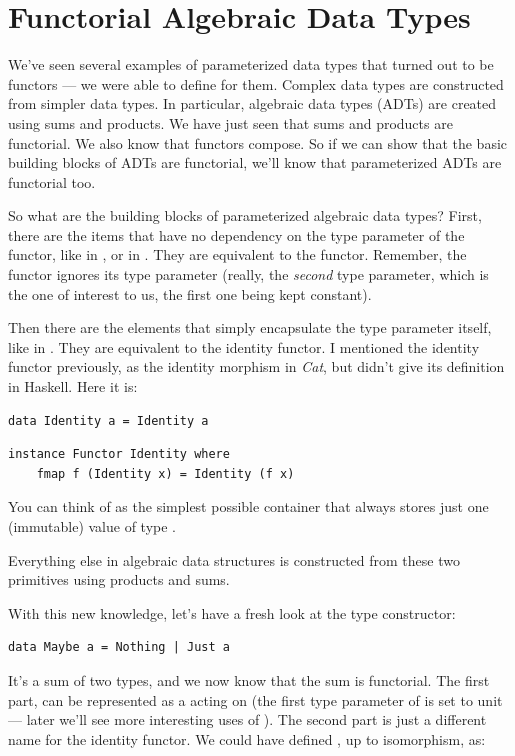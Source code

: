 \section{Functorial Algebraic Data
Types}\label{functorial-algebraic-data-types}

We've seen several examples of parameterized data types that turned out
to be functors --- we were able to define  for them.
Complex data types are constructed from simpler data types. In
particular, algebraic data types (ADTs) are created using sums and
products. We have just seen that sums and products are functorial. We
also know that functors compose. So if we can show that the basic
building blocks of ADTs are functorial, we'll know that parameterized
ADTs are functorial too.

So what are the building blocks of parameterized algebraic data types?
First, there are the items that have no dependency on the type parameter
of the functor, like  in , or 
in . They are equivalent to the  functor.
Remember, the  functor ignores its type parameter (really,
the \emph{second} type parameter, which is the one of interest to us,
the first one being kept constant).

Then there are the elements that simply encapsulate the type parameter
itself, like  in . They are equivalent to the
identity functor. I mentioned the identity functor previously, as the
identity morphism in \emph{Cat}, but didn't give its definition in
Haskell. Here it is:

\begin{Verbatim}[commandchars=\\\{\}]
data Identity a = Identity a
\end{Verbatim}

\begin{Verbatim}[commandchars=\\\{\}]
instance Functor Identity where
    fmap f (Identity x) = Identity (f x)
\end{Verbatim}
You can think of  as the simplest possible container
that always stores just one (immutable) value of type .

Everything else in algebraic data structures is constructed from these
two primitives using products and sums.

With this new knowledge, let's have a fresh look at the 
type constructor:

\begin{Verbatim}[commandchars=\\\{\}]
data Maybe a = Nothing | Just a
\end{Verbatim}
It's a sum of two types, and we now know that the sum is functorial. The
first part,  can be represented as a 
acting on  (the first type parameter of  is set
to unit --- later we'll see more interesting uses of ).
The second part is just a different name for the identity functor. We
could have defined , up to isomorphism, as:


